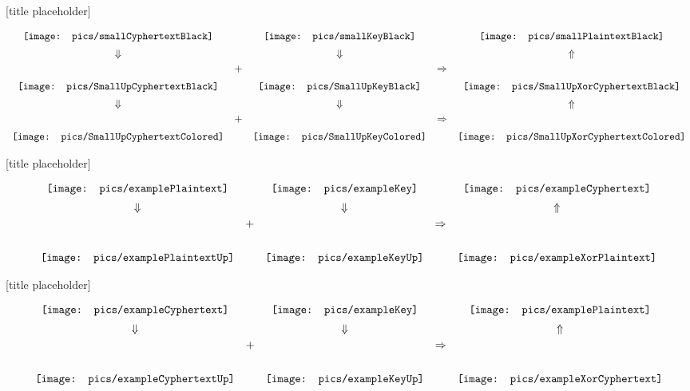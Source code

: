 \documentclass{beamer}
\newcommand{\smKeyBlack}{\mathord{\texttt{[image: pics/smallKeyBlack]}}}
\newcommand{\smMesBlack}{\mathord{\texttt{[image: pics/smallPlaintextBlack]}}}
\newcommand{\smCyphBlack}{\mathord{\texttt{[image: pics/smallCyphertextBlack]}}}
\newcommand{\smUpKeyBlack}{\mathord{\texttt{[image: pics/SmallUpKeyBlack]}}}
\newcommand{\smUpCyphBlack}{\mathord{\texttt{[image: pics/SmallUpCyphertextBlack]}}}
\newcommand{\smUpKeyColored}{\mathord{\texttt{[image: pics/SmallUpKeyColored]}}}
\newcommand{\smUpCyphColored}{\mathord{\texttt{[image: pics/SmallUpCyphertextColored]}}}
\newcommand{\smUpXorCyphColored}{\mathord{\texttt{[image: pics/SmallUpXorCyphertextColored]}}}
\newcommand{\smUpXorCyphBlack}{\mathord{\texttt{[image: pics/SmallUpXorCyphertextBlack]}}}
\newcommand{\exampleCyphertext}{\mathord{\texttt{[image: pics/exampleCyphertext]}}}
\newcommand{\exampleCyphertextUp}{\mathord{\texttt{[image: pics/exampleCyphertextUp]}}}
\newcommand{\exampleKey}{\mathord{\texttt{[image: pics/exampleKey]}}}
\newcommand{\exampleKeyUp}{\mathord{\texttt{[image: pics/exampleKeyUp]}}}
\newcommand{\examplePlaintext}{\mathord{\texttt{[image: pics/examplePlaintext]}}}
\newcommand{\examplePlaintextUp}{\mathord{\texttt{[image: pics/examplePlaintextUp]}}}
\newcommand{\exampleXorCyphertext}{\mathord{\texttt{[image: pics/exampleXorCyphertext]}}}
\newcommand{\exampleXorPlaintext}{\mathord{\texttt{[image: pics/exampleXorPlaintext]}}}
\begin{document}
\begin{frame}{[title placeholder]}

\begin{equation*}
\begin{array}{ccccc}
\smCyphBlack  &  & \smKeyBlack & & \smMesBlack \vspace{0.5em}\\
\Downarrow &  & \Downarrow& & \Uparrow \vspace{0.5em}\\
\smUpCyphBlack & \raisebox{4ex}{+} & \smUpKeyBlack & \raisebox{4ex}{$\Rightarrow$} & \smUpXorCyphBlack \vspace{0.5em} \\
\Downarrow &  & \Downarrow& & \Uparrow \vspace{0.5em}\\
\smUpCyphColored & \raisebox{4ex}{+} & \smUpKeyColored & \raisebox{4ex}{$\Rightarrow$} & \smUpXorCyphColored
\end{array}
\end{equation*}


\end{frame}



\begin{frame}{[title placeholder]}

\begin{equation*}
\begin{array}{ccccc}
\examplePlaintext &  & \exampleKey & & \exampleCyphertext \vspace{0.5em}\\
\Downarrow &  & \Downarrow& & \Uparrow \vspace{0.5em}\\
\examplePlaintextUp & \raisebox{7ex}{+} & \exampleKeyUp & \raisebox{7ex}{$\Rightarrow$} & \exampleXorPlaintext
\end{array}
\end{equation*}

\end{frame}



\begin{frame}{[title placeholder]}

\begin{equation*}
\begin{array}{ccccc}
\exampleCyphertext & & \exampleKey & & \examplePlaintext \vspace{0.5em}\\
\Downarrow &  & \Downarrow& & \Uparrow \vspace{0.5em}\\
\exampleCyphertextUp & \raisebox{7ex}{+} & \exampleKeyUp & \raisebox{7ex}{$\Rightarrow$} & \exampleXorCyphertext
\end{array}
\end{equation*}

\end{frame}
\end{document}
